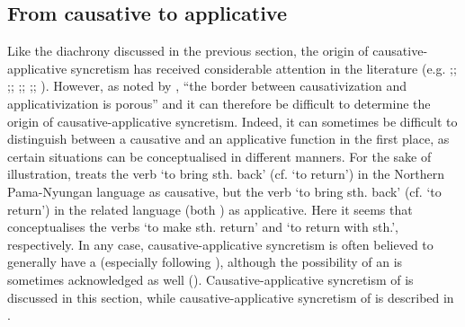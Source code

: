 \subsection{From causative to applicative} \label{diachrony:caus2appl}
Like the diachrony discussed in the previous section, the origin of causative-applicative syncretism has received considerable attention in the literature (e.g. \citealt[166ff.]{shibatani:pardeshi:2001};; \citeyear[116ff.]{shibatani:pardeshi:2002};; \citealt[64ff.]{peterson:2007};; \citealt[403ff.]{malchukov:2016};; \citeyear[13ff.]{malchukov:2017}). However, as noted by \cite[236]{zuniga:kittila:2019}, “the border between causativization and applicativization is porous” and it can therefore be difficult to determine the origin of causative-applicative syncretism. Indeed, it can sometimes be difficult to distinguish between a causative and an applicative function in the first place, as certain situations can be conceptualised in different manners. For the sake of illustration, \cite[14, 17]{austin:2005} treats the verb  ‘to bring sth. back’ (cf.  ‘to return’) in the Northern Pama-Nyungan language  as causative, but the verb  ‘to bring sth. back’ (cf.  ‘to return’) in the related language  (both ) as applicative. Here it seems that \citeauthor{austin:2005} conceptualises the verbs ‘to make sth. return’ and ‘to return with sth.’, respectively. In any case, causative-applicative syncretism is often believed to generally have a  (especially following \citealt{shibatani:pardeshi:2001, shibatani:pardeshi:2002}), although the possibility of an  is sometimes acknowledged as well (\citealt{wise:1990, payne:2002, guillaume:rose:2010, malchukov:2017}). Causative-applicative syncretism of  is discussed in this section, while causative-applicative syncretism of  is described in .

